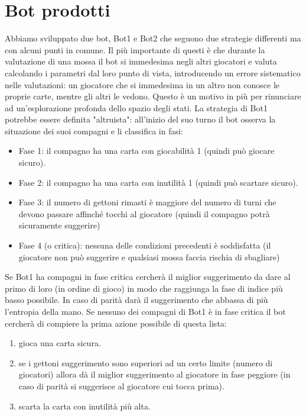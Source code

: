 \documentclass{article}
\begin{document}
\section{Bot prodotti}
Abbiamo sviluppato due bot, Bot1 e Bot2 che seguono due strategie differenti ma con alcuni punti in comune. Il più importante di questi è che durante la valutazione di una mossa il bot si immedesima negli altri giocatori e valuta calcolando i parametri dal loro punto di vista, introducendo un errore sistematico nelle valutazioni: un giocatore che si immedesima in un altro non conosce le proprie carte, mentre gli altri le vedono. Questo è un motivo in più per rinunciare ad un'esplorazione profonda dello spazio degli stati.\newline
\newline
La strategia di Bot1 potrebbe essere definita "altruista": all'inizio del suo turno il bot osserva la situazione dei suoi compagni e li classifica in fasi:
\begin{itemize}
    \item Fase 1: il compagno ha una carta con giocabilità 1 (quindi può giocare sicuro).
    \item Fase 2: il compagno ha una carta con inutilità 1 (quindi può scartare sicuro).
    \item Fase 3: il numero di gettoni rimasti è maggiore del numero di turni che devono passare affinché tocchi al giocatore (quindi il compagno potrà sicuramente suggerire)
    \item Fase 4 (o critica): nessuna delle condizioni precedenti è soddisfatta (il giocatore non può suggerire e qualsiasi mossa faccia rischia di sbagliare)
\end{itemize}
Se Bot1 ha compagni in fase critica cercherà il miglior suggerimento da dare al primo di loro (in ordine di gioco) in modo che raggiunga la fase di indice più basso possibile. In caso di parità darà il suggerimento che abbassa di più l'entropia della mano.\newline
Se nessuno dei compagni di Bot1 è in fase critica il bot cercherà di compiere la prima azione possibile di questa lista:
\begin{enumerate}
    \item gioca una carta sicura.
    \item se i gettoni suggerimento sono superiori ad un certo limite (numero di giocatori) allora dà il miglior suggerimento al giocatore in fase peggiore (in caso di parità si suggerisce al giocatore cui tocca prima).
    \item scarta la carta con inutilità più alta.
\end{enumerate}
\end{document}

